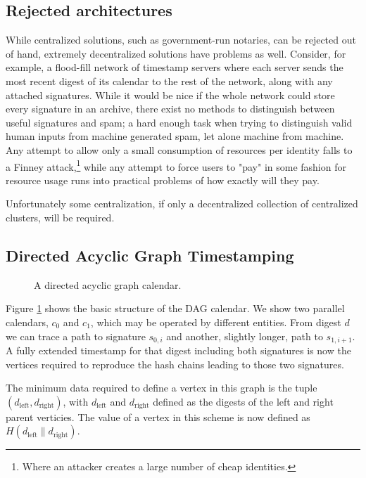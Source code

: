 \documentclass{article}
\begin{document}
\subsection{Rejected architectures}

While centralized solutions, such as government-run notaries, can be rejected
out of hand, extremely decentralized solutions have problems as well. Consider,
for example, a flood-fill network of timestamp servers where each server sends
the most recent digest of its calendar to the rest of the network, along with
any attached signatures. While it would be nice if the whole network could
store every signature in an archive, there exist no methods to distinguish
between useful signatures and spam; a hard enough task when trying to
distinguish valid human inputs from machine generated spam, let alone machine
from machine. Any attempt to allow only a small consumption of resources per
identity falls to a Finney attack,\footnote{Where an attacker creates a large
number of cheap identities.} while any attempt to force users to "pay" in some
fashion for resource usage runs into practical problems of how exactly will
they pay.

Unfortunately some centralization, if only a decentralized collection of
centralized clusters, will be required.


\subsection{Directed Acyclic Graph Timestamping}

\begin{figure}
        \centering
        
        \caption{A directed acyclic graph calendar.}
        \label{fig:dag-overview}
\end{figure}

Figure \ref{fig:dag-overview} shows the basic structure of the DAG calendar. We
show two parallel calendars, $c_0$ and $c_1$, which may be operated by
different entities. From digest $d$ we can trace a path to signature $s_{0,i}$
and another, slightly longer, path to $s_{1,i+1}$. A fully extended timestamp
for that digest including both signatures is now the vertices required to
reproduce the hash chains leading to those two signatures.

The minimum data required to define a vertex in this graph is the tuple
$(d_\mathrm{left},d_\mathrm{right})$, with $d_\mathrm{left}$ and
$d_\mathrm{right}$ defined as the digests of the left and right parent
verticies. The value of a vertex in this scheme is now defined as
$H(d_\mathrm{left}\|d_\mathrm{right})$.
\end{document}
